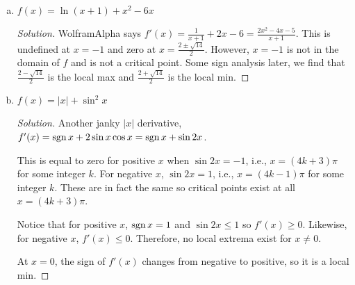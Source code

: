 \documentclass{agony}
\begin{document}
\begin{enumerate}[(a)]
  \item $f(x) = \ln(x+1) + x^2 - 6x$
        \begin{proof}[Solution]
          WolframAlpha says $f'(x) = \frac{1}{x+1} + 2x - 6 = \frac{2x^2 - 4x - 5}{x+1}$.
          This is undefined at $x=-1$ and zero at $x=\frac{2\pm\sqrt{14}}{2}$.
          However, $x=-1$ is not in the domain of $f$ and is not a critical point.
          Some sign analysis later, we find that $\frac{2-\sqrt{14}}{2}$ is the local max
          and $\frac{2+\sqrt{14}}{2}$ is the local min.
        \end{proof}
  \item $f(x) = |x|+\sin^2 x$
        \begin{proof}[Solution]
          Another janky $|x|$ derivative, $f'(x) = \operatorname{sgn} x + 2\sin x \cos x = \operatorname{sgn} x + \sin 2x$.

          This is equal to zero for positive $x$ when $\sin 2x = -1$, i.e., $x = (4k+3)\pi$ for some integer $k$.
          For negative $x$, $\sin 2x = 1$, i.e., $x = (4k-1)\pi$ for some integer $k$.
          These are in fact the same so critical points exist at all $x = (4k+3)\pi$.

          Notice that for positive $x$, $\operatorname{sgn} x = 1$ and $\sin 2x \leq 1$ so $f'(x) \geq 0$.
          Likewise, for negative $x$, $f'(x) \leq 0$.
          Therefore, no local extrema exist for $x \neq 0$.

          At $x = 0$, the sign of $f'(x)$ changes from negative to positive, so it is a local min.
        \end{proof}
\end{enumerate}
\end{document}
